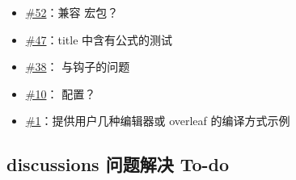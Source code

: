 \begin{itemize}
  \item \href{https://github.com/whutug/whu-thesis/issues/52}{\#52}：兼容  宏包？
  \item \href{https://github.com/whutug/whu-thesis/issues/47}{\#47}：title 中含有公式的测试
  \item \href{https://github.com/whutug/whu-thesis/issues/38}{\#38}： 与钩子的问题
  \item \href{https://github.com/whutug/whu-thesis/issues/10}{\#10}： 配置？
  \item \href{https://github.com/whutug/whu-thesis/issues/1}{\#1}：提供用户几种编辑器或 overleaf 的编译方式示例
\end{itemize}


\subsection{discussions 问题解决 To-do}

